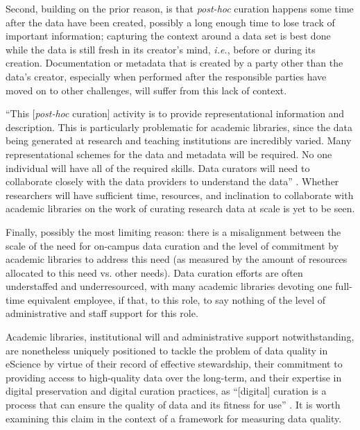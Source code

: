 \documentclass[12pt,letterpaper,titlepage,onecolumn,biblatex,backend=biber,style=chicago-authordate]{article}
\begin{document}
Second, building on the prior reason, is that \textit{post-hoc}
curation happens some time after the data have been created, possibly
a long enough time to lose track of important information; capturing
the context around a data set is best done while the data is still
fresh in its creator's mind, \textit{i.e.}, before or during its
creation. Documentation or metadata that is created by a party other
than the data's creator, especially when performed after the
responsible parties have moved on to other challenges, will suffer
from this lack of context.

``This [\textit{post-hoc} curation] activity is to provide
representational information and description. This is particularly
problematic for academic libraries, since the data being generated at
research and teaching institutions are incredibly varied. Many
representational schemes for the data and metadata will be
required. No one individual will have all of the required skills. Data
curators will need to collaborate closely with the data providers to
understand the data'' \autocite{heidorn:libraries}. Whether researchers
will have sufficient time, resources, and inclination to collaborate
with academic libraries on the work of curating research data at scale
is yet to be seen.

Finally, possibly the most limiting reason: there is a misalignment
between the scale of the need for on-campus data curation and the
level of commitment by academic libraries to address this need (as
measured by the amount of resources allocated to this need vs. other
needs). Data curation efforts are often understaffed and
underresourced, with many academic libraries devoting one full-time
equivalent employee, if that, to this role, to say nothing of the
level of administrative and staff support for this role.

Academic libraries, institutional will and administrative support
notwithstanding, are nonetheless uniquely positioned to tackle the
problem of data quality in eScience by virtue of their record of
effective stewardship, their commitment to providing access to
high-quality data over the long-term, and their expertise in digital
preservation and digital curation practices, as ``[digital] curation
is a process that can ensure the quality of data and its fitness for
use'' \autocite{curry:community}. It is worth examining this claim in the
context of a framework for measuring data quality.
\end{document}
